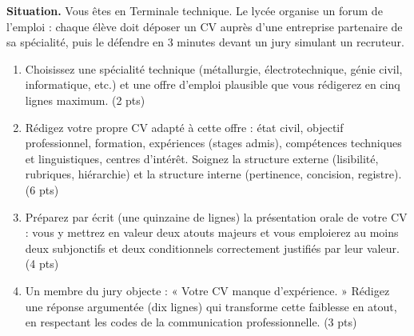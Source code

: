 \documentclass[11pt]{article}
\begin{document}
\begin{exercice}
\textbf{Situation.} Vous êtes en Terminale technique. Le lycée organise un forum de l'emploi : chaque élève doit déposer un CV auprès d'une entreprise partenaire de sa spécialité, puis le défendre en 3 minutes devant un jury simulant un recruteur.
\begin{enumerate}
\item Choisissez une spécialité technique (métallurgie, électrotechnique, génie civil, informatique, etc.) et une offre d'emploi plausible que vous rédigerez en cinq lignes maximum. (2 pts)
\item Rédigez votre propre CV adapté à cette offre : état civil, objectif professionnel, formation, expériences (stages admis), compétences techniques et linguistiques, centres d'intérêt. Soignez la structure externe (lisibilité, rubriques, hiérarchie) et la structure interne (pertinence, concision, registre). (6 pts)
\item Préparez par écrit (une quinzaine de lignes) la présentation orale de votre CV : vous y mettrez en valeur deux atouts majeurs et vous emploierez au moins deux subjonctifs et deux conditionnels correctement justifiés par leur valeur. (4 pts)
\item Un membre du jury objecte : « Votre CV manque d'expérience. » Rédigez une réponse argumentée (dix lignes) qui transforme cette faiblesse en atout, en respectant les codes de la communication professionnelle. (3 pts)
\end{enumerate}
\end{exercice}
\end{document}
